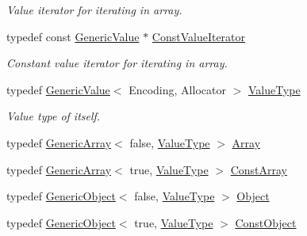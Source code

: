 \begin{DoxyCompactItemize}
\begin{DoxyCompactList}\small\item\em Value iterator for iterating in array. \end{DoxyCompactList}\item 
typedef const \hyperlink{classGenericValue}{Generic\+Value} $\ast$ \hyperlink{classGenericValue_a49010c6d6886f96ff0b0c51bccc7f6ea}{Const\+Value\+Iterator}
\begin{DoxyCompactList}\small\item\em Constant value iterator for iterating in array. \end{DoxyCompactList}\item 
typedef \hyperlink{classGenericValue}{Generic\+Value}$<$ Encoding, Allocator $>$ \hyperlink{classGenericValue_a43a39bb4fca9b9d3de3da6ac353d25ce}{Value\+Type}
\begin{DoxyCompactList}\small\item\em Value type of itself. \end{DoxyCompactList}\item 
typedef \hyperlink{classGenericArray}{Generic\+Array}$<$ false, \hyperlink{classGenericValue_a43a39bb4fca9b9d3de3da6ac353d25ce}{Value\+Type} $>$ \hyperlink{classGenericValue_a149e12992b8f6064c865a4cf55981b89}{Array}
\item 
typedef \hyperlink{classGenericArray}{Generic\+Array}$<$ true, \hyperlink{classGenericValue_a43a39bb4fca9b9d3de3da6ac353d25ce}{Value\+Type} $>$ \hyperlink{classGenericValue_a8f1d2728de56600b5f3df596e2a8a181}{Const\+Array}
\item 
typedef \hyperlink{classGenericObject}{Generic\+Object}$<$ false, \hyperlink{classGenericValue_a43a39bb4fca9b9d3de3da6ac353d25ce}{Value\+Type} $>$ \hyperlink{classGenericValue_aee3606d69d411ce0d98f29639585989b}{Object}
\item 
typedef \hyperlink{classGenericObject}{Generic\+Object}$<$ true, \hyperlink{classGenericValue_a43a39bb4fca9b9d3de3da6ac353d25ce}{Value\+Type} $>$ \hyperlink{classGenericValue_a55ad310f5434e0e4a93df616b326ba7e}{Const\+Object}
\end{DoxyCompactItemize}
